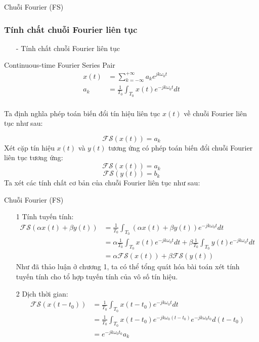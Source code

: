 \documentclass[8pt]{beamer}
\begin{document}
\begin{frame}{Chuỗi Fourier (FS)}
\subsubsection{Tính chất chuỗi Fourier liên tục}
\begin{itemize}
	\item[-] Tính chất chuỗi Fourier liên tục
\end{itemize}
\begin{block}{Continuous-time Fourier  Series Pair}
\begin{equation*}
\begin{split}
	x(t)&=\sum_{k=-\infty}^{+\infty}a_{k}e^{jk\omega_{0}t}\\
	a_{k}&=\frac{1}{T_{0}}\int_{T_{0}}x(t)e^{-jk\omega_{0}t}dt\\
\end{split}
\end{equation*}
\end{block}
Ta định nghĩa phép toán biến đổi tín hiệu liên tục $x(t)$ về chuỗi Fourier liên tục như sau:

$$\mathscr{FS}(x(t))=a_{k}$$
Xét cặp tín hiệu $x(t)$ và $y(t)$ tương ứng có phép toán biến đổi chuỗi Fourier liên tục tương ứng:
$$\mathscr{FS}(x(t))=a_{k}$$
$$\mathscr{FS}(y(t))=b_{k}$$
Ta xét các tính chất cơ bản của chuỗi Fourier liên tục như sau:
\end{frame}
\begin{frame}{Chuỗi Fourier (FS)}
\begin{enumerate}
	\item[1] Tính tuyến tính:
\begin{equation*}
\begin{split}
	\mathscr{FS}(\alpha x(t)+\beta y(t))&=\frac{1}{T_{0}}\int_{T_{0}}(\alpha x(t)+\beta y(t))e^{-jk\omega_{0}t}dt\\
					    &= \alpha\frac{1}{T_{0}}\int_{T_{0}}x(t)e^{-jk\omega_{0}t}dt+\beta\frac{1}{T_{0}}\int_{T_{0}}y(t)e^{-jk\omega_{0}t}dt\\
					    &= \alpha\mathscr{FS}(x(t))+\beta\mathscr{FS}(y(t))
\end{split}
\end{equation*}
Như đã thảo luận ở \alert{chương 1}, ta có thể tổng quát hóa bài toán xét tính tuyến tính cho tổ hợp tuyến tính của vô số tín hiệu.
\item[2] Dịch thời gian:
\begin{equation*}
\begin{split}
	\mathscr{FS}(x(t-t_{0}))&=\frac{1}{T_{0}}\int_{T_{0}}x(t-t_{0})e^{-jk\omega_{0}t}dt\\
				&= \frac{1}{T_{0}}\int_{T_{0}}x(t-t_{0})e^{-jk\omega_{0}(t-t_{0})}e^{-jk\omega_{0}{t_{0}}}d(t-t_{0})\\
				&= e^{-jk\omega_{0}t_{0}}a_{k}
\end{split}
\end{equation*}
\end{enumerate}
\end{frame}
\end{document}
